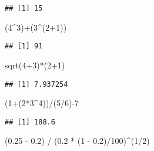 \documentclass[
]{book}
\newenvironment{Shaded}{\begin{snugshade}}{\end{snugshade}}
\newcommand{\DecValTok}[1]{\textcolor[rgb]{0.00,0.00,0.81}{#1}}
\newcommand{\FloatTok}[1]{\textcolor[rgb]{0.00,0.00,0.81}{#1}}
\newcommand{\FunctionTok}[1]{\textcolor[rgb]{0.00,0.00,0.00}{#1}}
\newcommand{\NormalTok}[1]{#1}
\newcommand{\SpecialCharTok}[1]{\textcolor[rgb]{0.00,0.00,0.00}{#1}}
\theoremstyle{definition}
\theoremstyle{definition}
\theoremstyle{definition}
\theoremstyle{definition}
\theoremstyle{remark}
\begin{document}
\begin{verbatim}
## [1] 15
\end{verbatim}

\begin{Shaded}
\begin{Highlighting}[]
\NormalTok{(}\DecValTok{4}\SpecialCharTok{\^{}}\DecValTok{3}\NormalTok{)}\SpecialCharTok{+}\NormalTok{(}\DecValTok{3}\SpecialCharTok{\^{}}\NormalTok{(}\DecValTok{2}\SpecialCharTok{+}\DecValTok{1}\NormalTok{))}
\end{Highlighting}
\end{Shaded}

\begin{verbatim}
## [1] 91
\end{verbatim}

\begin{Shaded}
\begin{Highlighting}[]
\FunctionTok{sqrt}\NormalTok{(}\DecValTok{4}\SpecialCharTok{+}\DecValTok{3}\NormalTok{)}\SpecialCharTok{*}\NormalTok{(}\DecValTok{2}\SpecialCharTok{+}\DecValTok{1}\NormalTok{)}
\end{Highlighting}
\end{Shaded}

\begin{verbatim}
## [1] 7.937254
\end{verbatim}

\begin{Shaded}
\begin{Highlighting}[]
\NormalTok{(}\DecValTok{1}\SpecialCharTok{+}\NormalTok{(}\DecValTok{2}\SpecialCharTok{*}\DecValTok{3}\SpecialCharTok{\^{}}\DecValTok{4}\NormalTok{))}\SpecialCharTok{/}\NormalTok{(}\DecValTok{5}\SpecialCharTok{/}\DecValTok{6}\NormalTok{)}\SpecialCharTok{{-}}\DecValTok{7}
\end{Highlighting}
\end{Shaded}

\begin{verbatim}
## [1] 188.6
\end{verbatim}

\begin{Shaded}
\begin{Highlighting}[]
\NormalTok{(}\FloatTok{0.25} \SpecialCharTok{{-}} \FloatTok{0.2}\NormalTok{) }\SpecialCharTok{/}\NormalTok{ (}\FloatTok{0.2} \SpecialCharTok{*}\NormalTok{ (}\DecValTok{1} \SpecialCharTok{{-}} \FloatTok{0.2}\NormalTok{)}\SpecialCharTok{/}\DecValTok{100}\NormalTok{)}\SpecialCharTok{\^{}}\NormalTok{(}\DecValTok{1}\SpecialCharTok{/}\DecValTok{2}\NormalTok{)}
\end{Highlighting}
\end{Shaded}
\end{document}
